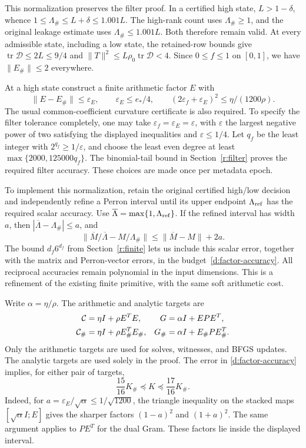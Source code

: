 \documentclass[11pt]{amsart}
\theoremstyle{definition}\newtheorem{definition}[theorem]{Definition}
\theoremstyle{remark}\newtheorem{remark}[theorem]{Remark}
\numberwithin{equation}{section}
\begin{document}
This normalization preserves the filter proof. In a certified high state,
$L>1-\delta$, whence
$1\le\Lambda_\#\le L+\delta\le1.001L$. The high-rank count uses
$\Lambda_\#\ge1$, and the original leakage estimate uses
$\Lambda_\#\le1.001L$. Both therefore remain valid. At every admissible
state, including a low state, the retained-row bounds give
$\operatorname{tr}\mathcal D\le2L\le9/4$ and
$\|T\|^2\le L\rho_0\operatorname{tr}\mathcal D<4$.
Since $0\le f\le1$ on $[0,1]$, we have $\|E_\#\|\le2$ everywhere.

At a high state construct a finite arithmetic factor $E$ with
\begin{equation}\label{d:factor-accuracy}
 \|E-E_\#\|\le\varepsilon_E,\qquad
 \varepsilon_E\le e_*/4,\qquad
 (2\varepsilon_f+\varepsilon_E)^2\le\eta/(1200\rho).
\end{equation}
The usual common-coefficient curvature certificate is also required.
To specify the filter tolerance completely, one may take
$\varepsilon_f=\varepsilon_E=\varepsilon$, with $\varepsilon$ the largest
negative power of two satisfying the displayed inequalities and
$\varepsilon\le1/4$. Let $q_f$ be the least integer with
$2^{q_f}\ge1/\varepsilon$, and choose the least even degree at least
$\max\{2000,125000q_f\}$. The binomial-tail bound in
Section~\ref{r:filter} proves the required filter accuracy. These choices
are made once per metadata epoch.

To implement this normalization, retain the original certified
high/low decision and independently refine a Perron interval until its
upper endpoint $\Lambda_{\rm ref}$ has the required scalar accuracy.
Use $\overline\Lambda=\max\{1,\Lambda_{\rm ref}\}$. If the refined interval
has width $a$, then
$|\overline\Lambda-\Lambda_\#|\le a$, and
\[
 \|\overline M/\overline\Lambda-M/\Lambda_\#\|
 \le\|\overline M-M\|+2a.
\]
The bound $d_f6^{d_f}$ from Section~\ref{r:finite} lets us include this
scalar error, together with the matrix and Perron-vector errors, in the
budget~\eqref{d:factor-accuracy}. All reciprocal accuracies remain polynomial in
the input dimensions. This is a refinement of the existing finite
primitive, with the same soft arithmetic cost.

Write $\alpha=\eta/\rho$. The arithmetic and analytic targets are
\begin{align}\label{d:targets}
 \mathcal C&=\eta I+\rho E^TE,&
 G&=\alpha I+EPE^T,\\
 \mathcal C_\#&=\eta I+\rho E_\#^TE_\#,&
 G_\#&=\alpha I+E_\#PE_\#^T.\notag
\end{align}
Only the arithmetic targets are used for solves, witnesses, and BFGS
updates. The analytic targets are used solely in the proof.
The error in \eqref{d:factor-accuracy} implies, for either pair of targets,
\begin{equation}\label{d:relative}
 \frac{15}{16}K_\#\preceq K\preceq\frac{17}{16}K_\#.
\end{equation}
Indeed, for $a=\varepsilon_E/\sqrt\alpha\le1/\sqrt{1200}$, the triangle
inequality on the stacked maps $[\sqrt\alpha I;E]$ gives the sharper
factors $(1-a)^2$ and $(1+a)^2$. The same argument applies to $PE^T$ for
the dual Gram. These factors lie inside the displayed interval.
\end{document}
